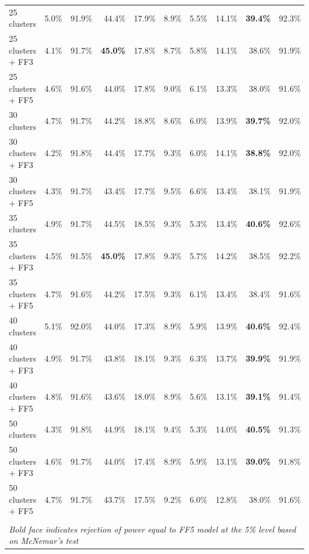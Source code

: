 \begin{table}[!h]
\begin{center}
\begin{tabular}{lrrrrrrrrr}
25 clusters	& 5.0\% & 91.9\% & 44.4\% & 17.9\% & 8.9\% & 5.5\% & 14.1\% & \textbf{39.4\%} & 92.3\% \\
25 clusters + FF3	& 4.1\% & 91.7\% & \textbf{45.0\%} & 17.8\% & 8.7\% & 5.8\% & 14.1\% & 38.6\% & 91.9\% \\
25 clusters + FF5	& 4.6\% & 91.6\% & 44.0\% & 17.8\% & 9.0\% & 6.1\% & 13.3\% & 38.0\% & 91.6\% \\
30 clusters	& 4.7\% & 91.7\% & 44.2\% & 18.8\% & 8.6\% & 6.0\% & 13.9\% & \textbf{39.7\%} & 92.0\% \\
30 clusters + FF3	& 4.2\% & 91.8\% & 44.4\% & 17.7\% & 9.3\% & 6.0\% & 14.1\% & \textbf{38.8\%} & 92.0\% \\
30 clusters + FF5	& 4.3\% & 91.7\% & 43.4\% & 17.7\% & 9.5\% & 6.6\% & 13.4\% & 38.1\% & 91.9\% \\
35 clusters	& 4.9\% & 91.7\% & 44.5\% & 18.5\% & 9.3\% & 5.3\% & 13.4\% & \textbf{40.6\%} & 92.6\% \\
35 clusters + FF3	& 4.5\% & 91.5\% & \textbf{45.0\%} & 17.8\% & 9.3\% & 5.7\% & 14.2\% & 38.5\% & 92.2\% \\
35 clusters + FF5	& 4.7\% & 91.6\% & 44.2\% & 17.5\% & 9.3\% & 6.1\% & 13.4\% & 38.4\% & 91.6\% \\
40 clusters	& 5.1\% & 92.0\% & 44.0\% & 17.3\% & 8.9\% & 5.9\% & 13.9\% & \textbf{40.6\%} & 92.4\% \\
40 clusters + FF3	& 4.9\% & 91.7\% & 43.8\% & 18.1\% & 9.3\% & 6.3\% & 13.7\% & \textbf{39.9\%} & 91.9\% \\
40 clusters + FF5	& 4.8\% & 91.6\% & 43.6\% & 18.0\% & 8.9\% & 5.6\% & 13.1\% & \textbf{39.1\%} & 91.4\% \\
50 clusters	& 4.3\% & 91.8\% & 44.9\% & 18.1\% & 9.4\% & 5.3\% & 14.0\% & \textbf{40.5\%} & 91.3\% \\
50 clusters + FF3	& 4.6\% & 91.7\% & 44.0\% & 17.4\% & 8.9\% & 5.9\% & 13.1\% & \textbf{39.0\%} & 91.8\% \\
50 clusters + FF5	& 4.7\% & 91.7\% & 43.7\% & 17.5\% & 9.2\% & 6.0\% & 12.8\% & 38.0\% & 91.6\% \\
\hline\\
\multicolumn{10}{l}{\itshape Bold face indicates rejection of power equal to FF5 model at the 5\% level based on McNemar's test}
    \end{tabular}
    \end{center}
\end{table}
